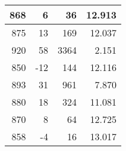 \begin{longtable}{|r|r|r|r|}
	868                                                                                             & 6                                                 & 36                                                   & 12.913                                                                                         \\ \hline
	875                                                                                             & 13                                                & 169                                                  & 12.037                                                                                         \\ \hline
	920                                                                                             & 58                                                & 3364                                                 & 2.151                                                                                          \\ \hline
	850                                                                                             & -12                                               & 144                                                  & 12.116                                                                                         \\ \hline
	893                                                                                             & 31                                                & 961                                                  & 7.870                                                                                          \\ \hline
	880                                                                                             & 18                                                & 324                                                  & 11.081                                                                                         \\ \hline
	870                                                                                             & 8                                                 & 64                                                   & 12.725                                                                                         \\ \hline
	858                                                                                             & -4                                                & 16                                                   & 13.017                                                                                         \\ \hline

\end{longtable}
